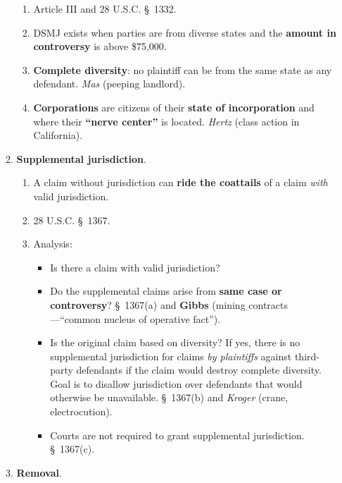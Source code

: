 \begin{enumerate}
\begin{enumerate}
        \begin{enumerate}
            \item Article III and 28 U.S.C. \S\ 1332.
            \item DSMJ exists when parties are from diverse states and the 
            \textbf{amount in controversy} is above \$75,000.
            \item \textbf{Complete diversity}: no plaintiff can be from the 
            same state as any defendant. \emph{Mas} (peeping landlord).
            \item \textbf{Corporations} are citizens of their \textbf{state of 
            incorporation} and where their \textbf{``nerve center''} is 
            located. \emph{Hertz} (class action in California).
        \end{enumerate}
        \item \textbf{Supplemental jurisdiction}.
        \begin{enumerate}
            \item A claim without jurisdiction can \textbf{ride the coattails} 
            of a claim \emph{with} valid jurisdiction.
            \item 28 U.S.C. \S\ 1367.
            \item Analysis:
            \begin{itemize}
                \item Is there a claim with valid jurisdiction?
                \item Do the supplemental claims arise from \textbf{same case 
                or controversy}? \S\ 1367(a) and \textbf{Gibbs} (mining 
                contracts---``common nucleus of operative fact'').
                \item Is the original claim based on diversity? If yes, there 
                is no supplemental jurisdiction for claims \emph{by 
                plaintiffs} against third-party defendants if the claim would 
                destroy complete diversity. Goal is to disallow jurisdiction 
                over defendants that would otherwise be unavailable. \S\ 
                1367(b) and \emph{Kroger} (crane, electrocution).
                \item Courts are not required to grant supplemental 
                jurisdiction. \S\ 1367(c).
            \end{itemize}
        \end{enumerate}
        \item \textbf{Removal}.
        \begin{enumerate}

\end{enumerate}
\end{enumerate}
\end{enumerate}
